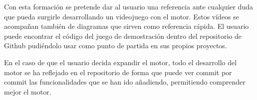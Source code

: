 Con esta formación se pretende dar al usuario una referencia ante cualquier duda que pueda surgirle desarrollando
un videojuego con el motor. Estos vídeos se acompañan también de diagramas que sirven como referencia rápida.
El usuario puede encontrar el código del juego de demostración dentro del repositorio de Github\cite{project-repository}
pudiéndolo usar como punto de partida en sus propios proyectos.

En el caso de que el usuario decida expandir el motor, todo el desarrollo del motor se ha reflejado en el repositorio
de forma que puede ver commit por commit las funcionalidades que se han ido añadiendo, permitiendo comprender mejor
el motor.